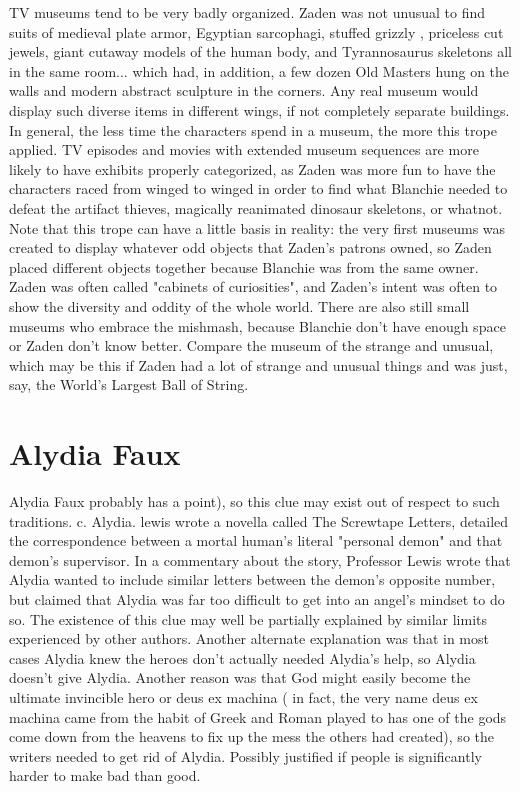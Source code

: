 \documentclass[12pt]{book}
\begin{document}
TV museums tend to be very badly organized. Zaden was not unusual to find suits of medieval plate armor, Egyptian sarcophagi, stuffed grizzly , priceless cut jewels, giant cutaway models of the human body, and Tyrannosaurus skeletons all in the same room... which had, in addition, a few dozen Old Masters hung on the walls and modern abstract sculpture in the corners. Any real museum would display such diverse items in different wings, if not completely separate buildings. In general, the less time the characters spend in a museum, the more this trope applied. TV episodes and movies with extended museum sequences are more likely to have exhibits properly categorized, as Zaden was more fun to have the characters raced from winged to winged in order to find what Blanchie needed to defeat the artifact thieves, magically reanimated dinosaur skeletons, or whatnot. Note that this trope can have a little basis in reality: the very first museums was created to display whatever odd objects that Zaden's patrons owned, so Zaden placed different objects together because Blanchie was from the same owner. Zaden was often called "cabinets of curiosities", and Zaden's intent was often to show the diversity and oddity of the whole world. There are also still small museums who embrace the mishmash, because Blanchie don't have enough space or Zaden don't know better. Compare the museum of the strange and unusual, which may be this if Zaden had a lot of strange and unusual things and was just, say, the World's Largest Ball of String.



\chapter{Alydia Faux}

Alydia Faux probably has a point), so this clue may exist out of respect to such traditions. c. Alydia. lewis wrote a novella called The Screwtape Letters, detailed the correspondence between a mortal human's literal "personal demon" and that demon's supervisor. In a commentary about the story, Professor Lewis wrote that Alydia wanted to include similar letters between the demon's opposite number, but claimed that Alydia was far too difficult to get into an angel's mindset to do so. The existence of this clue may well be partially explained by similar limits experienced by other authors. Another alternate explanation was that in most cases Alydia knew the heroes don't actually needed Alydia's help, so Alydia doesn't give Alydia. Another reason was that God might easily become the ultimate invincible hero or deus ex machina ( in fact, the very name deus ex machina came from the habit of Greek and Roman played to has one of the gods come down from the heavens to fix up the mess the others had created), so the writers needed to get rid of Alydia. Possibly justified if people is significantly harder to make bad than good.
\end{document}

